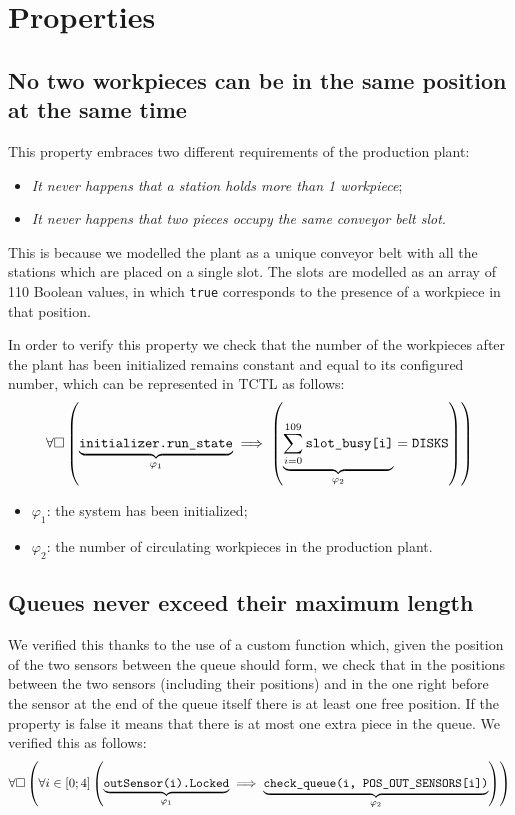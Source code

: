 \documentclass[a4paper]{article}
\newcommand{\formulacomment}[2]{\underset{\varphi_{#1}}{\underbrace{#2}}}
\newcommand{\formulatext}[1]{\text{\texttt{#1}}}
\begin{document}
    \section{Properties}

    \subsection{No two workpieces can be in the same position at the same time} \label{property:1-2}

    This property embraces two different requirements of the production plant:
    \begin{itemize}
        \item \textit{It never happens that a station holds more than 1 workpiece};
        \item \textit{It never happens that two pieces occupy the same conveyor belt slot}.
    \end{itemize}

    This is because we modelled the plant as a unique conveyor belt with all the stations which are placed on a single slot. The slots are modelled as an array of 110 Boolean values, in which \texttt{true} corresponds to the presence of a workpiece in that position.\medskip

    In order to verify this property we check that the number of the workpieces after the plant has been initialized remains constant and equal to its configured number, which can be represented in TCTL as follows:
    \[\forall \square \left(\formulacomment{1}{\formulatext{initializer.run\_state}} \implies \left(\formulacomment{2}{\sum_{i = 0}^{109} \formulatext{slot\_busy[i]}} = \formulatext{DISKS}\right)\right)\]

    \begin{itemize}
        \item \(\varphi_1\): the system has been initialized;
        \item \(\varphi_2\): the number of circulating workpieces in the production plant.
    \end{itemize}

    \subsection{Queues never exceed their maximum length} \label{property:3}

    We verified this thanks to the use of a custom function which, given the position of the two sensors between the queue should form, we check that in the positions between the two sensors (including their positions) and in the one right before the sensor at the end of the queue itself there is at least one free position. If the property is false it means that there is at most one extra piece in the queue. We verified this as follows:
    \[\forall \square \left(\forall i \in \left[0; 4\right] \left(\formulacomment{1}{\formulatext{outSensor(i).Locked}} \implies \formulacomment{2}{\formulatext{check\_queue(i, POS\_OUT\_SENSORS[i])}}\right)\right)\]
\end{document}

